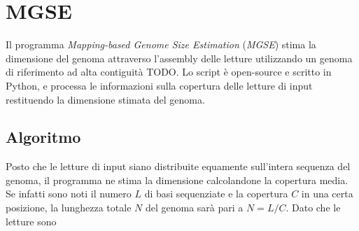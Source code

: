 \documentclass[crop=false, class=book]{standalone}
\begin{document}
	\section{MGSE}
	Il programma \textit{Mapping-based Genome Size Estimation} (\textit{MGSE}) stima la dimensione del genoma attraverso l'assembly delle letture utilizzando un genoma di riferimento ad alta contiguità \cite{pucker2019MGSE} TODO. Lo script è open-source e scritto in Python, e processa le informazioni sulla copertura delle letture di input restituendo la dimensione stimata del genoma.
	
	\subsection{Algoritmo}
	Posto che le letture di input siano distribuite equamente sull'intera sequenza del genoma, il programma ne stima la dimensione calcolandone la copertura media. Se infatti sono noti il numero $L$ di basi sequenziate e la copertura $C$ in una certa posizione, la lunghezza totale $N$ del genoma sarà pari a $N = L/C$.
	Dato che le letture sono 
	
	

	
	
	
\end{document}
